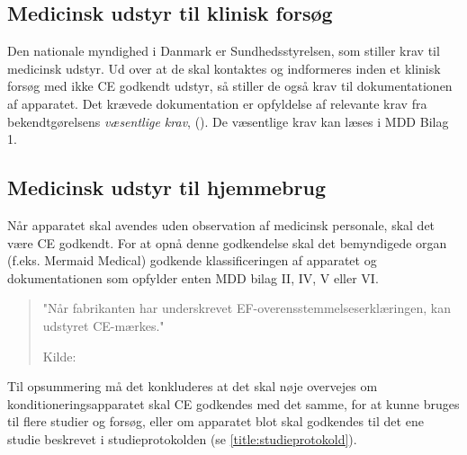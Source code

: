 \subsection{Medicinsk udstyr til klinisk forsøg}
Den nationale myndighed i Danmark er Sundhedsstyrelsen, som stiller krav til medicinsk udstyr. Ud over at de skal kontaktes og indformeres inden et klinisk forsøg med ikke CE godkendt udstyr, så stiller de også krav til dokumentationen af apparatet. Det krævede dokumentation er opfyldelse af relevante krav fra bekendtgørelsens \textit{væsentlige krav}, (\cite{RefWorks:41}). De væsentlige krav kan læses i MDD Bilag 1.

\subsection{Medicinsk udstyr til hjemmebrug}
Når apparatet skal avendes uden observation af medicinsk personale, skal det være CE godkendt. For at opnå denne godkendelse skal det bemyndigede organ (f.eks. Mermaid Medical) godkende klassificeringen af apparatet og dokumentationen som opfylder enten MDD bilag II, IV, V eller VI. 

\begin{quote}
	"Når fabrikanten har underskrevet EF-overensstemmelseserklæringen, kan udstyret CE-mærkes."
	
	Kilde: \cite{RefWorks:43}
\end{quote}

Til opsummering må det konkluderes at det skal nøje overvejes om konditioneringsapparatet skal CE godkendes med det samme, for at kunne bruges til flere studier og forsøg, eller om apparatet blot skal godkendes til det ene studie beskrevet i studieprotokolden (se \ref{title:studieprotokold}).

